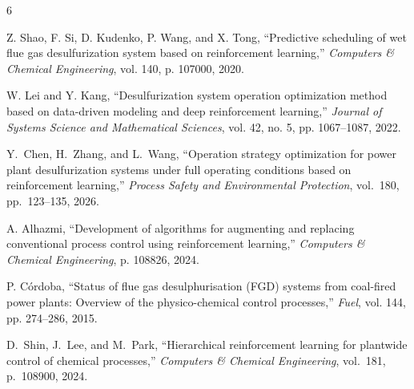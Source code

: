 \documentclass[journal]{IEEEtran}
\begin{document}
\begin{thebibliography}{6}

Z. Shao, F. Si, D. Kudenko, P. Wang, and X. Tong, ``Predictive scheduling of wet flue gas desulfurization system based on reinforcement learning,'' \textit{Computers \& Chemical Engineering}, vol. 140, p. 107000, 2020.

W. Lei and Y. Kang, ``Desulfurization system operation optimization method based on data-driven modeling and deep reinforcement learning,'' \textit{Journal of Systems Science and Mathematical Sciences}, vol. 42, no. 5, pp. 1067--1087, 2022.

Y.~Chen, H.~Zhang, and L.~Wang, ``Operation strategy optimization for power plant desulfurization systems under full operating conditions based on reinforcement learning,'' \textit{Process Safety and Environmental Protection}, vol.~180, pp.~123--135, 2026.

A. Alhazmi, ``Development of algorithms for augmenting and replacing conventional process control using reinforcement learning,'' \textit{Computers \& Chemical Engineering}, p. 108826, 2024.

P. Córdoba, ``Status of flue gas desulphurisation (FGD) systems from coal-fired power plants: Overview of the physico-chemical control processes,'' \textit{Fuel}, vol. 144, pp. 274--286, 2015.

D.~Shin, J.~Lee, and M.~Park, ``Hierarchical reinforcement learning for plantwide control of chemical processes,'' \textit{Computers \& Chemical Engineering}, vol.~181, p.~108900, 2024.

\end{thebibliography}
\end{document}
